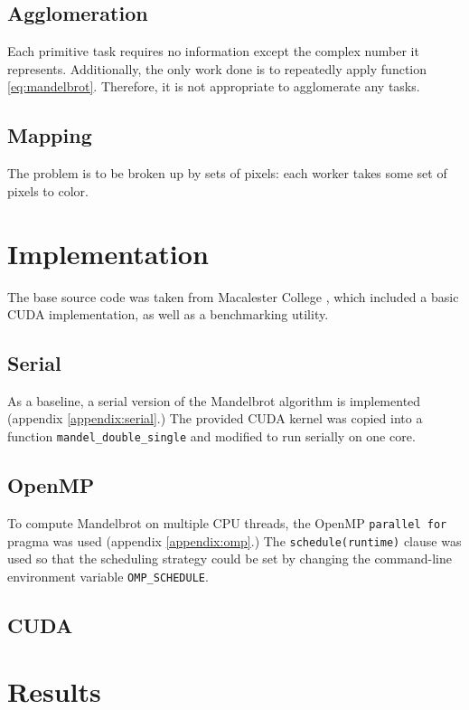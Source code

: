 \documentclass{article}
\begin{document}
\subsection{Agglomeration}
Each primitive task requires no information except the complex number it represents. Additionally, the only work done is to repeatedly apply function \ref{eq:mandelbrot}. Therefore, it is not appropriate to agglomerate any tasks.

\subsection{Mapping}
The problem is to be broken up by sets of pixels: each worker takes some set of pixels to color.


\section{Implementation} \label{sec:impl}
The base source code was taken from Macalester College \cite{mandel_orig}, which included a basic CUDA implementation, as well as a benchmarking utility.

\subsection{Serial}
As a baseline, a serial version of the Mandelbrot algorithm is implemented (appendix \ref{appendix:serial}.) The provided CUDA kernel was copied into a function \verb|mandel_double_single| and modified to run serially on one core.

\subsection{OpenMP}
To compute Mandelbrot on multiple CPU threads, the OpenMP \verb|parallel for| pragma was used (appendix \ref{appendix:omp}.) The \verb|schedule(runtime)| clause was used so that the scheduling strategy could be set by changing the command-line environment variable \verb|OMP_SCHEDULE|.

\subsection{CUDA}


\section{Results}
\appendix
\pagebreak
\end{document}
